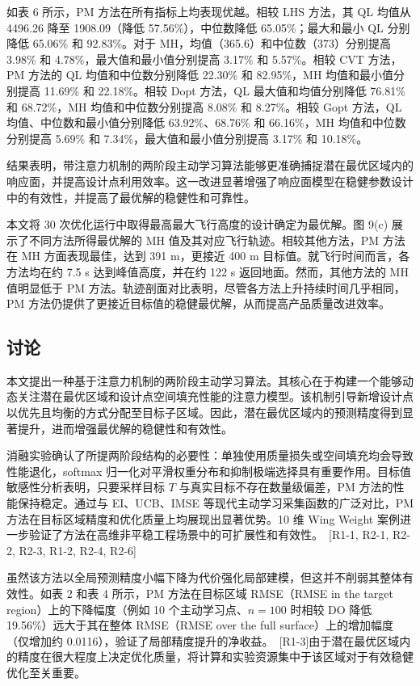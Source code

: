 \documentclass[]{interact}
\DeclareRobustCommand{\reviewadd}[2]{{\color{red}#1}\ {\color{blue}\footnotesize[#2]}}
\theoremstyle{plain}%
\theoremstyle{definition}
\theoremstyle{remark}
\begin{document}
	如表 6 所示，PM 方法在所有指标上均表现优越。相较 LHS 方法，其 QL 均值从 4496.26 降至 1908.09（降低 57.56\%），中位数降低 65.05\%；最大和最小 QL 分别降低 65.06\% 和 92.83\%。对于 MH，均值（365.6）和中位数（373）分别提高 3.98\% 和 4.78\%，最大值和最小值分别提高 3.17\% 和 5.57\%。相较 CVT 方法，PM 方法的 QL 均值和中位数分别降低 22.30\% 和 82.95\%，MH 均值和最小值分别提高 11.69\% 和 22.18\%。相较 D\-opt 方法，QL 最大值和均值分别降低 76.81\% 和 68.72\%，MH 均值和中位数分别提高 8.08\% 和 8.27\%。相较 G\-opt 方法，QL 均值、中位数和最小值分别降低 63.92\%、68.76\% 和 66.16\%，MH 均值和中位数分别提高 5.69\% 和 7.34\%，最大值和最小值分别提高 3.17\% 和 10.18\%。
	
	结果表明，带注意力机制的两阶段主动学习算法能够更准确捕捉潜在最优区域内的响应面，并提高设计点利用效率。这一改进显著增强了响应面模型在稳健参数设计中的有效性，并提高了最优解的稳健性和可靠性。
	
	本文将 30 次优化运行中取得最高最大飞行高度的设计确定为最优解。图 9(c) 展示了不同方法所得最优解的 MH 值及其对应飞行轨迹。相较其他方法，PM 方法在 MH 方面表现最佳，达到 391 m，更接近 400 m 目标值。就飞行时间而言，各方法均在约 7.5 s 达到峰值高度，并在约 122 s 返回地面。然而，其他方法的 MH 值明显低于 PM 方法。轨迹剖面对比表明，尽管各方法上升持续时间几乎相同，PM 方法仍提供了更接近目标值的稳健最优解，从而提高产品质量改进效率。

\subsection{讨论}
本文提出一种基于注意力机制的两阶段主动学习算法。其核心在于构建一个能够动态关注潜在最优区域和设计点空间填充性能的注意力模型。该机制引导新增设计点以优先且均衡的方式分配至目标子区域。因此，潜在最优区域内的预测精度得到显著提升，进而增强最优解的稳健性和有效性。

\reviewadd{消融实验确认了所提两阶段结构的必要性：单独使用质量损失或空间填充均会导致性能退化，softmax 归一化对平滑权重分布和抑制极端选择具有重要作用。目标值敏感性分析表明，只要采样目标 $T$ 与真实目标不存在数量级偏差，PM 方法的性能保持稳定。通过与 EI、UCB、IMSE 等现代主动学习采集函数的广泛对比，PM 方法在目标区域精度和优化质量上均展现出显著优势。10 维 Wing Weight 案例进一步验证了方法在高维非平稳工程场景中的可扩展性和有效性。}{R1-1, R2-1, R2-2, R2-3, R1-2, R2-4, R2-6}

虽然该方法以全局预测精度小幅下降为代价强化局部建模，但这并不削弱其整体有效性。\reviewadd{如表 2 和表 4 所示，PM 方法在目标区域 RMSE（RMSE in the target region）上的下降幅度（例如 10 个主动学习点、$n=100$ 时相较 DO 降低 19.56\%）远大于其在整体 RMSE（RMSE over the full surface）上的增加幅度（仅增加约 0.0116），验证了局部精度提升的净收益。}{R1-3}由于潜在最优区域内的精度在很大程度上决定优化质量，将计算和实验资源集中于该区域对于有效稳健优化至关重要。
\end{document}
